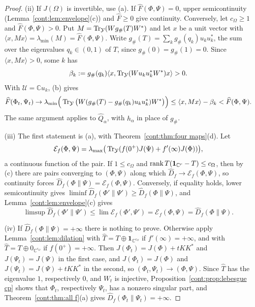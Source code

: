 \begin{proof}
(ii) If $J(\Omega)$ is invertible, use (a). If $\widehat F(\Phi,\Psi)=0$, upper semicontinuity (Lemma~\ref{cont:lem:envelope}(c)) and $\widehat F\geq0$ give continuity. Conversely, let $c_\Omega\geq1$ and $\widehat F(\Phi,\Psi)>0$. Put $M=\operatorname{Tr}_{\mathcal{Y}}(Wg_\#(T)W^*)$ and let $x$ be a unit vector with $\langle x,Mx\rangle=\lambda_{\min}(M)=\widehat F(\Phi,\Psi)$. Write $g_\#(T)=\sum_kg_\#(q_k)u_ku_k^*$, the sum over the eigenvalues $q_k\in(0,1)$ of $T$, since $g_\#(0)=g_\#(1)=0$. Since $\langle x,Mx\rangle>0$, some $k$ has
\[
\beta_k:=g_\#(q_k)\langle x,\operatorname{Tr}_{\mathcal{Y}}(Wu_ku_k^*W^*)x\rangle>0.
\]
With $\mathcal{U}=\mathbb{C}u_k$, (b) gives
\[
\widehat F(\Phi_t,\Psi_t)\to\lambda_{\min}\Big(\operatorname{Tr}_{\mathcal{Y}}\big(W(g_\#(T)-g_\#(q_k)u_ku_k^*)W^*\big)\Big)\leq\langle x,Mx\rangle-\beta_k<\widehat F(\Phi,\Psi).
\]
The same argument applies to $\widehat Q_\alpha$, with $h_\alpha$ in place of $g_\#$.

(iii) The first statement is (a), with Theorem~\ref{cont:thm:four maps}(d). Let
\[
\mathcal{E}_f(\Phi,\Psi)=\lambda_{\max}\big(\operatorname{Tr}_{\mathcal{Y}}(f(0^+)J(\Psi)+f'(\infty)J(\Phi))\big),
\]
a continuous function of the pair. If $1\leq c_\Omega$ and $\operatorname{rank} T(\mathbf{1}_{\mathbb{C}^r}-T)\leq c_\Omega$, then by (c) there are pairs converging to $(\Phi,\Psi)$ along which $\widehat D_f\to \mathcal{E}_f(\Phi,\Psi)$, so continuity forces $\widehat D_f(\Phi\|\Psi)=\mathcal{E}_f(\Phi,\Psi)$. Conversely, if equality holds, lower semicontinuity gives $\liminf\widehat D_f(\Phi'\|\Psi')\geq\widehat D_f(\Phi\|\Psi)$, and Lemma~\ref{cont:lem:envelope}(c) gives
\[
\limsup\widehat D_f(\Phi'\|\Psi')\leq\lim \mathcal{E}_f(\Phi',\Psi')=\mathcal{E}_f(\Phi,\Psi)=\widehat D_f(\Phi\|\Psi).
\]


(iv) If $\widehat D_f(\Phi\|\Psi)=+\infty$ there is nothing to prove. Otherwise apply Lemma~\ref{cont:lem:dilation} with $\widehat T=T\oplus\mathbf{1}_{\mathbb{C}^{c_\Omega}}$ if $f'(\infty)=+\infty$, and with $\widehat T=T\oplus0_{\mathbb{C}^{c_\Omega}}$ if $f(0^+)=+\infty$. Then $J(\Phi_t)=J(\Phi)+tKK^*$ and $J(\Psi_t)=J(\Psi)$ in the first case, and $J(\Phi_t)=J(\Phi)$ and $J(\Psi_t)=J(\Psi)+tKK^*$ in the second, so $(\Phi_t,\Psi_t)\to(\Phi,\Psi)$. Since $\widehat T$ has the eigenvalue $1$, respectively $0$, and $W_t$ is injective, Proposition~\ref{cont:prop:lebesgue cp} shows that $\Phi_t$, respectively $\Psi_t$, has a nonzero singular part, and Theorem~\ref{cont:thm:all f}(a) gives $\widehat D_f(\Phi_t\|\Psi_t)=+\infty$.
\end{proof}

